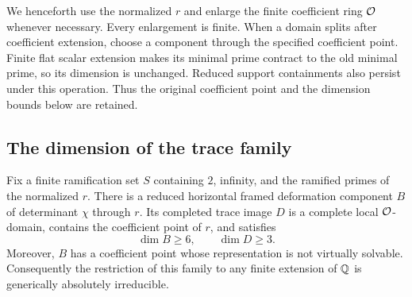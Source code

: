 We henceforth use the normalized $r$ and enlarge the finite
coefficient ring $\mathcal O$ whenever necessary.  Every enlargement is
finite.  When a domain splits after coefficient extension, choose a
component through the specified coefficient point.  Finite flat
scalar extension makes its minimal prime contract to the old minimal
prime, so its dimension is unchanged.  Reduced support containments
also persist under this operation.  Thus the original coefficient
point and the dimension bounds below are retained.

\subsection{The dimension of the trace family}

\begin{lemma}\label{lem:large-family}
Fix a finite ramification set $S$ containing $2$, infinity, and the
ramified primes of the normalized $r$.  There is a reduced
horizontal framed deformation component $B$ of determinant $\chi$
through $r$.  Its completed trace image $D$ is a complete local
$\mathcal O$-domain, contains the coefficient point of $r$, and satisfies
\[
 \dim B\ge6,\qquad \dim D\ge3.
\]
Moreover, $B$ has a coefficient point whose representation is not
virtually solvable.  Consequently the restriction of this family to
any finite extension of $\mathbb Q$ is generically absolutely irreducible.
\end{lemma}

